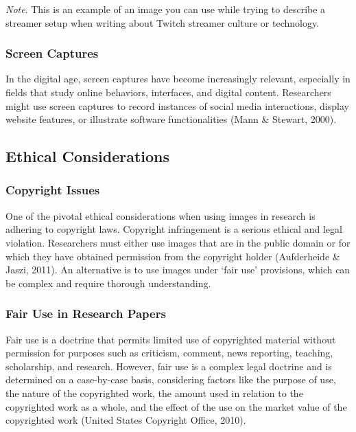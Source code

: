 \documentclass[
  b5paper]{book}
\begin{document}
\emph{Note}. This is an example of an image you can use while trying to describe a streamer setup when writing about Twitch streamer culture or technology.

\hypertarget{screen-captures}{%
\subsubsection*{Screen Captures}\label{screen-captures}}

In the digital age, screen captures have become increasingly relevant, especially in fields that study online behaviors, interfaces, and digital content. Researchers might use screen captures to record instances of social media interactions, display website features, or illustrate software functionalities (Mann \& Stewart, 2000).

\hypertarget{ethical-considerations-8}{%
\subsection*{Ethical Considerations}\label{ethical-considerations-8}}

\hypertarget{copyright-issues}{%
\subsubsection*{Copyright Issues}\label{copyright-issues}}

One of the pivotal ethical considerations when using images in research is adhering to copyright laws. Copyright infringement is a serious ethical and legal violation. Researchers must either use images that are in the public domain or for which they have obtained permission from the copyright holder (Aufderheide \& Jaszi, 2011). An alternative is to use images under `fair use' provisions, which can be complex and require thorough understanding.

\hypertarget{fair-use-in-research-papers}{%
\subsubsection*{Fair Use in Research Papers}\label{fair-use-in-research-papers}}

Fair use is a doctrine that permits limited use of copyrighted material without permission for purposes such as criticism, comment, news reporting, teaching, scholarship, and research. However, fair use is a complex legal doctrine and is determined on a case-by-case basis, considering factors like the purpose of use, the nature of the copyrighted work, the amount used in relation to the copyrighted work as a whole, and the effect of the use on the market value of the copyrighted work (United States Copyright Office, 2010).
\end{document}
